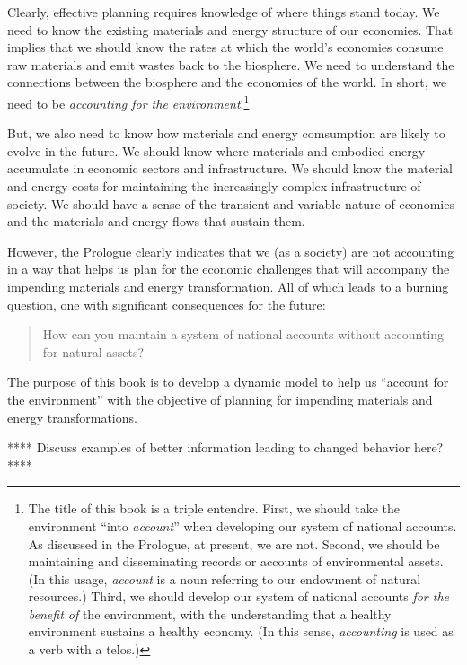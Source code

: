 Clearly, effective planning requires knowledge of where things stand today.
We need to know the existing materials and energy structure of our economies. 
That implies that we should know the rates at which 
the world's economies consume raw materials and emit wastes back to the biosphere.
We need to understand the connections between the biosphere and the economies of the world.
In short, we need to be \emph{accounting for the environment}!\footnote{The title 
	of this book is a triple entendre.
	First, we should take the environment ``into \emph{account}''
		when developing our system of national accounts.
		As discussed in the Prologue, at present, we are not.
	Second, we should be maintaining and disseminating
		records or accounts of environmental assets. 
		(In this usage, \emph{account} is a noun
		referring to our endowment of natural resources.)
	Third, we should develop our system of national accounts 
		\emph{for the benefit of} the environment, 
		with the understanding 
		that a healthy environment sustains a healthy economy.
		(In this sense, \emph{accounting} is used as a verb with a telos.)
}

But, we also need to know how materials and energy comsumption 
are likely to evolve in the future.
We should know where materials and embodied energy accumulate 
in economic sectors and infrastructure. 
We should know the material and energy costs for maintaining the
increasingly-complex infrastructure of society.
We should have a sense of the transient and variable nature of economies
and the materials and energy flows that sustain them.

However, the Prologue clearly indicates that we (as a society) 
are not accounting in a way that helps us plan 
for the economic challenges that will accompany 
the impending materials and energy transformation.
All of which leads to a burning question,
one with significant consequences for the future:

\begin{quote}
	How can you maintain a system of national accounts without accounting for natural assets?
\end{quote}

The purpose of this book is to develop a dynamic model to help us
``account for the environment''
with the objective of planning for impending materials and energy transformations.

**** Discuss examples of better information leading to changed behavior here? ****


